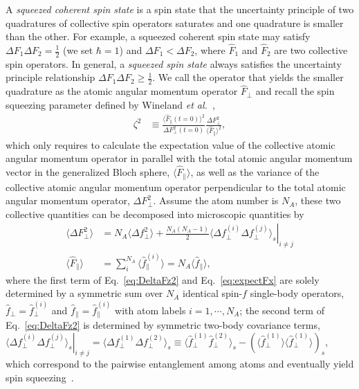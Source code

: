 \documentclass[preprint,aps,pra,onecolumn,superscriptaddress]{revtex4-1} %
\newcommand{\expect}[1]{\big\langle #1 \big\rangle}
\begin{document}
A \textit{squeezed coherent spin state} is a spin state that the uncertainty principle of two quadratures of collective spin operators saturates and one quadrature is smaller than the other. 
For example, a squeezed coherent spin state may satisfy $ \Delta F_1\Delta F_2=\frac{1}{2} $ (we set $ \hbar=1 $) and $ \Delta F_1<\Delta F_2 $, where $ \hat{F}_1 $ and $ \hat{F}_2 $ are two collective spin operators. 
In general, a \textit{squeezed spin state} always satisfies the uncertainty principle relationship $ \Delta F_1\Delta F_2\ge\frac{1}{2} $.
We call the operator that yields the smaller quadrature as the atomic angular momentum operator $ \hat{F}_\perp $ and 
recall the spin squeezing parameter defined by Wineland {\emph{et al.}}~\cite{Wineland1992},
\begin{align}
\zeta^2 &\equiv \frac{\expect{\hat{F}_\parallel(t=0)}^2}{\Delta F_\perp^2(t=0)} \frac{\Delta F_\perp^2}{\expect{\hat{F}_\parallel}^2},
\end{align}
which only requires to calculate the expectation value of the collective atomic angular momentum operator in parallel with the total atomic angular momentum vector in the generalized Bloch sphere, $ \expect{\hat{F}_\parallel} $, as well as the variance of the collective atomic angular momentum operator perpendicular to the total atomic angular momentum operator, $ \Delta F_\perp^2 $. 
Assume the atom number is $ N_A $, these two collective quantities can be decomposed into microscopic quantities by 
\begin{align}
\expect{\Delta F_\perp^2} &= N_A \expect{\Delta f_\perp^2}+\frac{N_A(N_A-1)}{2}\left. \expect{\Delta f_\perp^{(i)}\Delta f_\perp^{(j)}}_s\right|_{i\neq j}\label{eq:DeltaFz2}\\
\expect{\hat{F}_\parallel } &= \sum_i^{N_A} \expect{\hat{f}_\parallel ^{(i)}}=N_A \expect{\hat{f}_\parallel},\label{eq:expectFx}
\end{align}
where the first term of Eq.~\eqref{eq:DeltaFz2} and Eq.~\eqref{eq:expectFx} are solely determined by a symmetric sum over $N_A$ identical spin-$f$ single-body operators, $ \hat{f}_\perp=\hat{f}_\perp^{(i)} $ and $ \hat{f}_\parallel=\hat{f}_\parallel^{(i)} $ with atom labels $ i=1,\cdots,N_A $; the second term of Eq.~\eqref{eq:DeltaFz2} is determined by symmetric two-body covariance terms, $ \left.\expect{\Delta f_\perp^{(i)}\Delta f_\perp^{(j)}}_s\right|_{i\neq j}=\expect{\Delta f_\perp^{(1)}\Delta f_\perp^{(2)}}_s\equiv \expect{\hat{f}_\perp^{(1)}\hat{f}_\perp^{(2)}}_s-\left( \expect{\hat{f}_\perp^{(1)}} \expect{\hat{f}_\perp^{(1)}}\right)_s $, which correspond to the pairwise entanglement among atoms and eventually yield spin squeezing~\cite{Wang2003Spin}.
\end{document}

